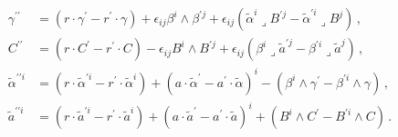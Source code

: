 \documentclass[debug]{phd}
\begin{document}
\begin{equation}
\begin{split}
							\gamma^{\prime\prime} 					& =(r\cdot\gamma^{\prime}-r^{\prime}\cdot\gamma)+\epsilon_{ij}\beta^{i}\wedge\beta^{\prime j}+\epsilon_{ij}(\tilde{\alpha}^{i}\lrcorner B^{\prime j}-\tilde{\alpha}^{\prime i}\lrcorner B^{j})\, ,\\
							C^{\prime\prime} 						& =(r\cdot C^{\prime}-r^{\prime}\cdot C)-\epsilon_{ij}B^{i}\wedge B^{\prime j}+\epsilon_{ij}(\beta^{i}\lrcorner\tilde{a}^{\prime j}-\beta^{\prime i}\lrcorner\tilde{a}^{j})\, ,\\
							\tilde{\alpha}^{\prime\prime i} 				& =(r\cdot\tilde{\alpha}^{\prime i}-r^{\prime}\cdot\tilde{\alpha}^{i})+(a\cdot\tilde{\alpha}^{\prime}-a^{\prime}\cdot\tilde{\alpha})^{i}-(\beta^{i}\wedge\gamma^{\prime}-\beta^{\prime i}\wedge\gamma)\, ,\\
							\tilde{a}^{\prime\prime i} 					& =(r\cdot\tilde{a}^{\prime i}-r^{\prime}\cdot\tilde{a}^{i})+(a\cdot\tilde{a}^{\prime}-a^{\prime}\cdot\tilde{a})^{i}+(B^{i}\wedge C^{\prime}-B^{\prime i}\wedge C) \, .
						\end{split}
					\end{equation}
			
\end{document}
